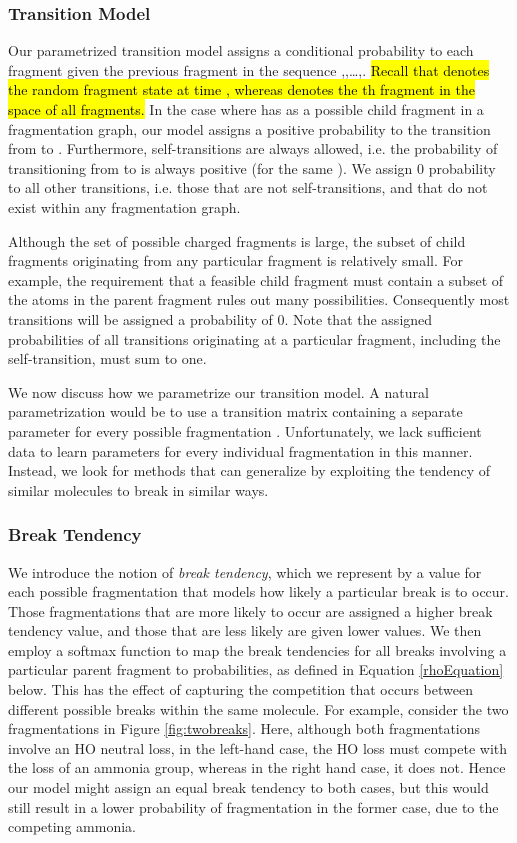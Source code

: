 \subsubsection{Transition Model}
\label{TransitionModel}

Our parametrized transition model assigns a conditional probability to each fragment given the previous fragment in the sequence ,,\dots,. 
\hl{Recall that  denotes the random fragment state at time , whereas  denotes the th fragment in the space of all fragments.} 
In the case where  has  as a possible child fragment in a fragmentation graph, our model assigns a positive probability to the transition from  to . 
Furthermore, self-transitions are always allowed, i.e. the probability of transitioning from  to  is always positive (for the same ). 
We assign 0 probability to all other transitions, i.e. those that are not self-transitions, and that do not exist within any fragmentation graph. 

Although the set of possible charged fragments  is large, the subset of child fragments originating from any particular fragment is relatively small. 
For example, the requirement that a feasible child fragment must contain a subset of the atoms in the parent fragment rules out many possibilities.  
Consequently most transitions will be assigned a probability of 0. 
Note that the assigned probabilities of all transitions originating at a particular fragment, including the self-transition, must sum to one.

We now discuss how we parametrize our transition model.
A natural parametrization would be to use a transition matrix containing a separate parameter for every possible fragmentation .
Unfortunately, we lack sufficient data to learn parameters for every individual fragmentation in this manner. 
Instead, we look for methods that can generalize by exploiting the tendency of similar molecules to break in similar ways.

\subsubsection{Break Tendency}
 
We introduce the notion of \emph{break tendency}, which we represent by a value  for each possible fragmentation  that models how likely a particular break is to occur. 
Those fragmentations that are more likely to occur are assigned a higher break tendency value, and those that are less likely are given lower values.  
We then employ a softmax function to map the break tendencies for all breaks involving a particular parent fragment to probabilities, as defined in Equation \ref{rhoEquation} below. 
This has the effect of capturing the competition that occurs between different possible breaks within the same molecule.
For example, consider the two fragmentations in Figure \ref{fig:twobreaks}.
Here, although both fragmentations involve an HO neutral loss, in the left-hand case, the HO loss must compete with the loss of an ammonia group, whereas in the right hand case, it does not.
Hence our model might assign an equal break tendency to both cases, but this would still result in a lower probability of fragmentation in the former case, due to the competing ammonia.
 
